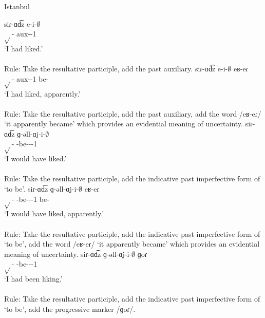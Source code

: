

\begin{exe}
	\ex Istanbul \label{sent:Istanbul:morpho:verb:complex:resultpart:pst}
	\begin{xlist}
		\ex \gll siɾ-ɑd͡z e-i-$\emptyset$ \\
		$\sqrt{}$-{\rptcp} {aux}-{\pst}-1{\sg} \\
		\trans `I had liked.' \\
		 \\
		Rule: Take the resultative participle, add the past auxiliary.
		\ex \gll siɾ-ɑd͡z e-i-$\emptyset$ eʁ-eɾ \\
		$\sqrt{}$-{\rptcp} {aux}-{\pst}-1{\sg} be-{\eptcp} \\
		\trans `I had liked, apparently.' \\
		 \\
		Rule: Take the resultative participle, add the past auxiliary, add the word /eʁ-eɾ/ `it apparently became' which provides an evidential meaning of uncertainty.
		\ex \gll siɾ-ɑd͡z ɡ-əll-ɑj-i-$\emptyset$ \\
		$\sqrt{}$-{\rptcp} {\ind}-be-{\thgloss}-{\pst}-1{\sg} \\
		\trans `I would have liked.' \\
		 \\
		Rule: Take the resultative participle, add the indicative past imperfective form of `to be'.
		\ex \gll siɾ-ɑd͡z ɡ-əll-ɑj-i-$\emptyset$ eʁ-eɾ \\
		$\sqrt{}$-{\rptcp} {\ind}-be-{\thgloss}-{\pst}-1{\sg} be-{\eptcp} \\
		\trans `I would have liked, apparently.' \\
		 \\
		Rule: Take the resultative participle, add the indicative past imperfective form of `to be', add the word /eʁ-eɾ/ `it apparently became' which provides an evidential meaning of uncertainty.
		\ex \gll siɾ-ɑd͡z ɡ-əll-ɑj-i-$\emptyset$ ɡoɾ \\
		$\sqrt{}$-{\rptcp} {\ind}-be-{\thgloss}-{\pst}-1{\sg} {\prog} \\
		\trans `I had been liking.' \\
		 \\
		Rule: Take the resultative participle, add the indicative past imperfective form of `to be', add the progressive marker /ɡoɾ/. 

\end{xlist}
\end{exe}
